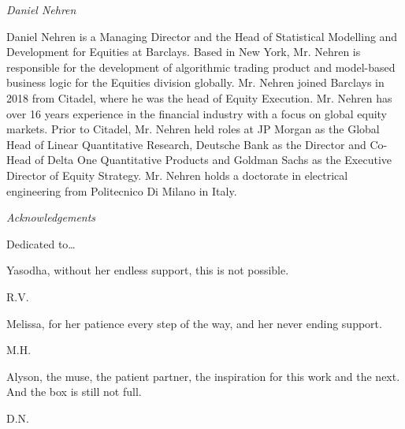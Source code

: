 {\noindent\large\itshape Daniel Nehren} \medskip

\noindent Daniel Nehren is a Managing Director and the Head of Statistical Modelling and Development for Equities at Barclays. Based in New York, Mr. Nehren is responsible for the development of algorithmic trading product and model-based business logic for the Equities division globally. Mr. Nehren joined Barclays in 2018 from Citadel, where he was the head of Equity Execution. Mr. Nehren has over 16 years experience in the financial industry with a focus on global equity markets. Prior to Citadel, Mr. Nehren held roles at JP Morgan as the Global Head of Linear Quantitative Research, Deutsche Bank as the Director and Co-Head of Delta One Quantitative Products and Goldman Sachs as the Executive Director of Equity Strategy. Mr. Nehren holds a doctorate in electrical engineering from Politecnico Di Milano in Italy.



\newpage



{\itshape \large Acknowledgements} \vspace{0.5cm}


Dedicated to\dots \vspace{0.5cm}


\begin{minipage}[t]{0.8\textwidth}
	\raggedright
		Yasodha, without her endless support, this is not possible. \par
  	\raggedleft
  	R.V.
\end{minipage} \vspace{1cm}


\begin{minipage}[t]{0.8\textwidth}
	\raggedright
		Melissa, for her patience every step of the way, and her never ending support. \par
  	\raggedleft
  	M.H.
\end{minipage} \vspace{1cm}


\begin{minipage}[t]{0.8\textwidth}
	\raggedright
		Alyson, the muse, the patient partner, the inspiration for this work and the next. And the box is still not full. \par
  	\raggedleft
  	D.N.
\end{minipage} 